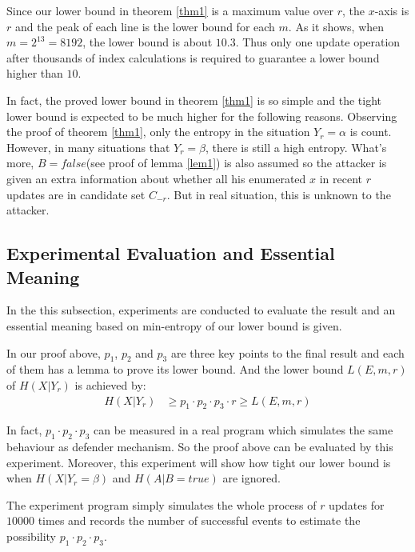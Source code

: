 \documentclass[10pt, conference, compsocconf]{IEEEtran}
\begin{document}
        Since our lower bound in theorem \ref{thm1} is a maximum value
        over $r$, the $x$-axis is $r$ and the peak of each line
        is the lower bound for each $m$. As it shows, when $m = 2^{13} = 8192$, the lower
        bound is about $10.3$.
        Thus only one update operation after thousands of index calculations is required
        to guarantee a lower bound higher than $10$.

        In fact, the proved lower bound in theorem \ref{thm1} is so
        simple and the tight lower bound is expected to be much higher
        for the following reasons.
        Observing the proof of theorem \ref{thm1}, only the
        entropy in the situation $Y_r = \alpha$ is count. However, in
        many situations that $Y_r = \beta$, there is still a high entropy.
        What's more, $B = false$(see proof of lemma \ref{lem1}) is also assumed so the attacker is
        given an extra information about whether all his enumerated $x$
        in recent $r$ updates are in candidate set $C_{-r}$. But
        in real situation, this is unknown to the attacker.

    \subsection{Experimental Evaluation and Essential Meaning}
        In the this subsection, experiments
        are conducted to evaluate the result and an essential meaning based on min-entropy
        of our lower bound is given.

        In our proof above, $p_1$,
        $p_2$ and $p_3$ are
        three key points to the final result and each of them
        has a lemma to prove its lower bound.
        And the lower bound $L(E, m, r)$ of $H(X | Y_r)$ is achieved by:
        \begin{align*}
            H(X | Y_r) &\geq p_1 \cdot p_2 \cdot p_3 \cdot r
                \geq L(E, m, r)
        \end{align*}

        In fact, $p_1 \cdot p_2 \cdot p_3$ can be measured in a real program which
        simulates the same behaviour as defender mechanism.
        So the proof above can be evaluated by this experiment.
        Moreover, this experiment will show how tight our lower bound is
        when $H(X | Y_r = \beta)$ and $H(A | B = true)$ are ignored.

        The experiment program simply simulates the whole process of $r$ updates
        for $10000$ times and records the number of successful events
        to estimate the possibility $p_1 \cdot p_2 \cdot p_3$.
\end{document}
